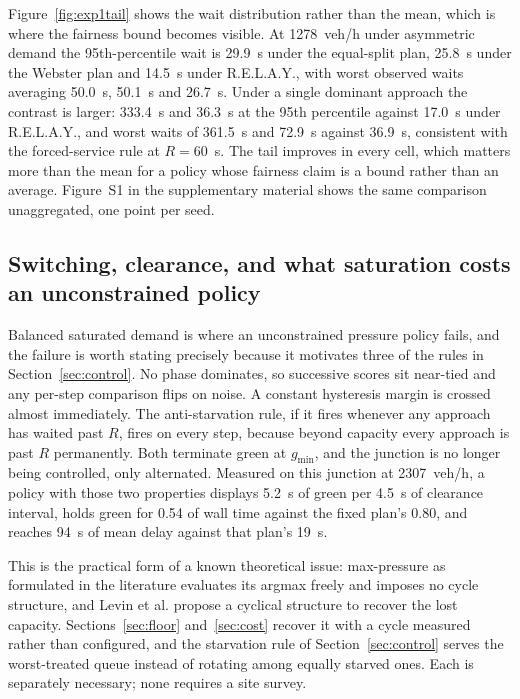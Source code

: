 \documentclass[journal]{IEEEtran}
\newcommand{\relay}{R.E.L.A.Y.}
\begin{document}
Figure~\ref{fig:exp1tail} shows the wait distribution rather than the mean, which is where the fairness
bound becomes visible. At 1278~veh/h under asymmetric demand the 95th-percentile wait is 29.9~s under
the equal-split plan, 25.8~s under the Webster plan and 14.5~s under \relay, with worst observed waits
averaging 50.0~s, 50.1~s and 26.7~s. Under a single dominant approach the contrast is larger: 333.4~s
and 36.3~s at the 95th percentile against 17.0~s under \relay, and worst waits of 361.5~s and 72.9~s
against 36.9~s, consistent with the forced-service rule at $R = 60$~s. The tail improves in every cell,
which matters more than the mean for a policy whose fairness claim is a bound rather than an average.
Figure~S1 in the supplementary material shows the same comparison unaggregated, one point per seed.



\subsection{Switching, clearance, and what saturation costs an unconstrained policy}
\label{sec:discussion}



Balanced saturated demand is where an unconstrained pressure policy fails, and the failure is worth
stating precisely because it motivates three of the rules in Section~\ref{sec:control}. No phase
dominates, so successive scores sit near-tied and any per-step comparison flips on noise. A constant
hysteresis margin is crossed almost immediately. The anti-starvation rule, if it fires whenever any
approach has waited past $R$, fires on every step, because beyond capacity every approach is past $R$
permanently. Both terminate green at $g_{\min}$, and the junction is no longer being controlled, only
alternated. Measured on this junction at 2307~veh/h, a policy with those two properties displays
5.2~s of green per 4.5~s of clearance interval, holds green for 0.54 of wall time against the fixed
plan's 0.80, and reaches 94~s of mean delay against that plan's 19~s.

This is the practical form of a known theoretical issue: max-pressure as formulated in the literature
evaluates its argmax freely and imposes no cycle structure, and Levin et al.
\cite{Levin2020CyclicalMaxPressure} propose a cyclical structure to recover the lost capacity.
Sections~\ref{sec:floor} and~\ref{sec:cost} recover it with a cycle measured rather than configured,
and the starvation rule of Section~\ref{sec:control} serves the worst-treated queue instead of
rotating among equally starved ones. Each is separately necessary; none requires a site survey.
\end{document}
